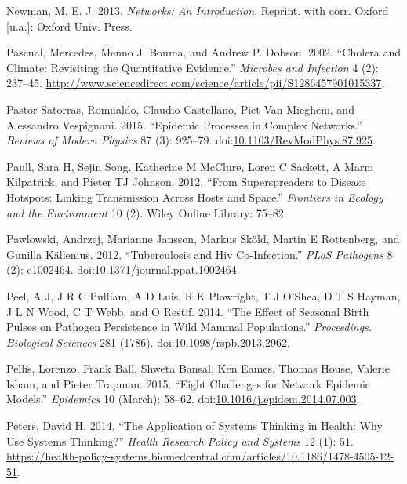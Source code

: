 \documentclass[]{book}
\theoremstyle{definition}
\theoremstyle{definition}
\theoremstyle{definition}
\theoremstyle{remark}
\begin{document}
\hypertarget{ref-newman13}{}
Newman, M. E. J. 2013. \emph{Networks: An Introduction}. Reprint. with
corr. Oxford {[}u.a.{]}: Oxford Univ. Press.

\hypertarget{ref-pascual02}{}
Pascual, Mercedes, Menno J. Bouma, and Andrew P. Dobson. 2002. ``Cholera
and Climate: Revisiting the Quantitative Evidence.'' \emph{Microbes and
Infection} 4 (2): 237--45.
\url{http://www.sciencedirect.com/science/article/pii/S1286457901015337}.

\hypertarget{ref-pastor-satorras15}{}
Pastor-Satorras, Romualdo, Claudio Castellano, Piet Van Mieghem, and
Alessandro Vespignani. 2015. ``Epidemic Processes in Complex Networks.''
\emph{Reviews of Modern Physics} 87 (3): 925--79.
doi:\href{https://doi.org/10.1103/RevModPhys.87.925}{10.1103/RevModPhys.87.925}.

\hypertarget{ref-paull12}{}
Paull, Sara H, Sejin Song, Katherine M McClure, Loren C Sackett, A Marm
Kilpatrick, and Pieter TJ Johnson. 2012. ``From Superspreaders to
Disease Hotspots: Linking Transmission Across Hosts and Space.''
\emph{Frontiers in Ecology and the Environment} 10 (2). Wiley Online
Library: 75--82.

\hypertarget{ref-pawlowski12}{}
Pawlowski, Andrzej, Marianne Jansson, Markus Sköld, Martin E Rottenberg,
and Gunilla Källenius. 2012. ``Tuberculosis and Hiv Co-Infection.''
\emph{PLoS Pathogens} 8 (2): e1002464.
doi:\href{https://doi.org/10.1371/journal.ppat.1002464}{10.1371/journal.ppat.1002464}.

\hypertarget{ref-peel14}{}
Peel, A J, J R C Pulliam, A D Luis, R K Plowright, T J O'Shea, D T S
Hayman, J L N Wood, C T Webb, and O Restif. 2014. ``The Effect of
Seasonal Birth Pulses on Pathogen Persistence in Wild Mammal
Populations.'' \emph{Proceedings. Biological Sciences} 281 (1786).
doi:\href{https://doi.org/10.1098/rspb.2013.2962}{10.1098/rspb.2013.2962}.

\hypertarget{ref-pellis15}{}
Pellis, Lorenzo, Frank Ball, Shweta Bansal, Ken Eames, Thomas House,
Valerie Isham, and Pieter Trapman. 2015. ``Eight Challenges for Network
Epidemic Models.'' \emph{Epidemics} 10 (March): 58--62.
doi:\href{https://doi.org/10.1016/j.epidem.2014.07.003}{10.1016/j.epidem.2014.07.003}.

\hypertarget{ref-peters14}{}
Peters, David H. 2014. ``The Application of Systems Thinking in Health:
Why Use Systems Thinking?'' \emph{Health Research Policy and Systems} 12
(1): 51.
\url{https://health-policy-systems.biomedcentral.com/articles/10.1186/1478-4505-12-51}.
\end{document}
